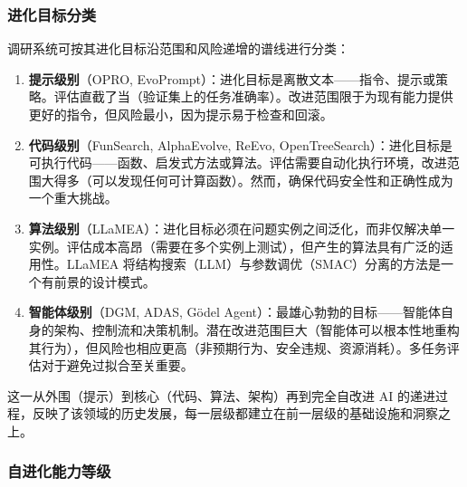 \subsubsection{进化目标分类}

调研系统可按其进化目标沿范围和风险递增的谱线进行分类：

\begin{enumerate}
    \item \textbf{提示级别}（OPRO, EvoPrompt）：进化目标是离散文本——指令、提示或策略。评估直截了当（验证集上的任务准确率）。改进范围限于为现有能力提供更好的指令，但风险最小，因为提示易于检查和回滚。

    \item \textbf{代码级别}（FunSearch, AlphaEvolve, ReEvo, OpenTreeSearch）：进化目标是可执行代码——函数、启发式方法或算法。评估需要自动化执行环境，改进范围大得多（可以发现任何可计算函数）。然而，确保代码安全性和正确性成为一个重大挑战。

    \item \textbf{算法级别}（LLaMEA）：进化目标必须在问题实例之间泛化，而非仅解决单一实例。评估成本高昂（需要在多个实例上测试），但产生的算法具有广泛的适用性。LLaMEA 将结构搜索（LLM）与参数调优（SMAC）分离的方法是一个有前景的设计模式。

    \item \textbf{智能体级别}（DGM, ADAS, G\"{o}del Agent）：最雄心勃勃的目标——智能体自身的架构、控制流和决策机制。潜在改进范围巨大（智能体可以根本性地重构其行为），但风险也相应更高（非预期行为、安全违规、资源消耗）。多任务评估对于避免过拟合至关重要。
\end{enumerate}

这一从外围（提示）到核心（代码、算法、架构）再到完全自改进 AI 的递进过程，反映了该领域的历史发展，每一层级都建立在前一层级的基础设施和洞察之上。


\subsubsection{自进化能力等级}

